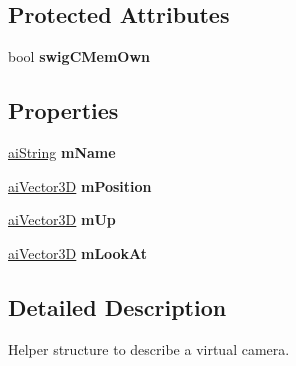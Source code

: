 \subsection*{Protected Attributes}
\begin{DoxyCompactItemize}
\item 
\hypertarget{structai_camera_ad052a50665dbb9f7ddb4cf1db19a5d14}{bool {\bfseries swig\+C\+Mem\+Own}}\label{structai_camera_ad052a50665dbb9f7ddb4cf1db19a5d14}

\end{DoxyCompactItemize}
\subsection*{Properties}
\begin{DoxyCompactItemize}
\item 
\hypertarget{structai_camera_a45d22fa994baee4ba9affd7dca4a03e3}{\hyperlink{structai_string}{ai\+String} {\bfseries m\+Name}}\label{structai_camera_a45d22fa994baee4ba9affd7dca4a03e3}

\item 
\hypertarget{structai_camera_ae5fa6f4afbb059e8a4d42fa13b20c908}{\hyperlink{structai_vector3_d}{ai\+Vector3\+D} {\bfseries m\+Position}}\label{structai_camera_ae5fa6f4afbb059e8a4d42fa13b20c908}

\item 
\hypertarget{structai_camera_a8a8ff4f2598becb6249efcdbad635a71}{\hyperlink{structai_vector3_d}{ai\+Vector3\+D} {\bfseries m\+Up}}\label{structai_camera_a8a8ff4f2598becb6249efcdbad635a71}

\item 
\hypertarget{structai_camera_abfc17fe405597f605e79e57266baf0a5}{\hyperlink{structai_vector3_d}{ai\+Vector3\+D} {\bfseries m\+Look\+At}}\label{structai_camera_abfc17fe405597f605e79e57266baf0a5}

\end{DoxyCompactItemize}


\subsection{Detailed Description}
Helper structure to describe a virtual camera.

